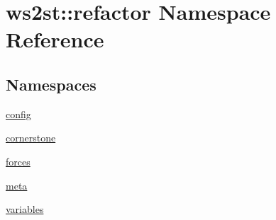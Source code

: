 \hypertarget{namespacews2st_1_1refactor}{}\section{ws2st\+:\+:refactor Namespace Reference}
\label{namespacews2st_1_1refactor}
\subsection*{Namespaces}
\begin{DoxyCompactItemize}
\item 
 \mbox{\hyperlink{namespacews2st_1_1refactor_1_1config}{config}}
\item 
 \mbox{\hyperlink{namespacews2st_1_1refactor_1_1cornerstone}{cornerstone}}
\item 
 \mbox{\hyperlink{namespacews2st_1_1refactor_1_1forces}{forces}}
\item 
 \mbox{\hyperlink{namespacews2st_1_1refactor_1_1meta}{meta}}
\item 
 \mbox{\hyperlink{namespacews2st_1_1refactor_1_1variables}{variables}}
\end{DoxyCompactItemize}
